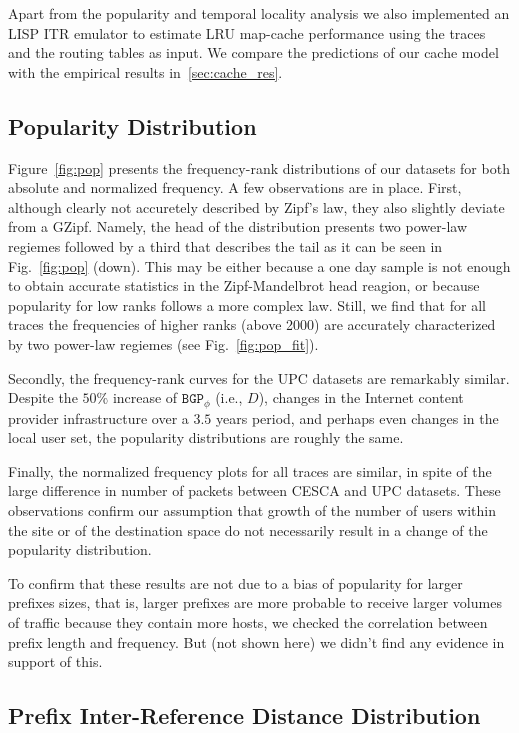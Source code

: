 \documentclass[twocolumn, 10pt]{article}
\theoremstyle{plain}
\begin{document}
Apart from the popularity and temporal locality analysis we also implemented
an LISP ITR emulator to estimate LRU map-cache performance using the traces and
the routing tables as input. We compare the predictions of our
cache model with the empirical results in~\ref{sec:cache_res}.

\subsection{Popularity Distribution}\label{sec:pop_assumption}

Figure~\ref{fig:pop} presents the frequency-rank distributions of our datasets
for both absolute and normalized frequency. A few observations are in
place. First, although clearly not accuretely described by Zipf's law, they
also slightly deviate from a GZipf. Namely, the head of the distribution
presents two power-law regiemes followed by a third that describes the tail as
it can be seen in Fig.~\ref{fig:pop} (down). This may be either
because a one day sample is not enough to obtain accurate statistics in the
Zipf-Mandelbrot head reagion, or because popularity for low ranks follows a
more complex law. Still, we find that for all traces the frequencies of higher
ranks (above 2000) are accurately characterized by two power-law regiemes (see
Fig.~\ref{fig:pop_fit}). 


Secondly, the frequency-rank curves for the UPC datasets are remarkably
similar. Despite the  $50\%$ increase of $\texttt{BGP}_{\phi}$ (i.e., $D$),
changes in the Internet content provider infrastructure over a $3.5$ years
period, and perhaps even changes in the local user set, the popularity
distributions are roughly the same. 

Finally, the normalized frequency plots for all traces are similar, in spite
of the large difference in number of packets between CESCA and UPC datasets.
These observations confirm our assumption that growth of the number of users
within the site or of the destination space do not necessarily result in a
change of the popularity distribution. 


To confirm that these results are not due to a bias of popularity for larger
prefixes sizes, that is, larger prefixes are more probable to receive larger
volumes of traffic because they contain more hosts, we checked the correlation
between prefix length and frequency. But (not shown here) we didn't find any
evidence in support of this. 




\subsection{Prefix Inter-Reference Distance Distribution}
\end{document}
